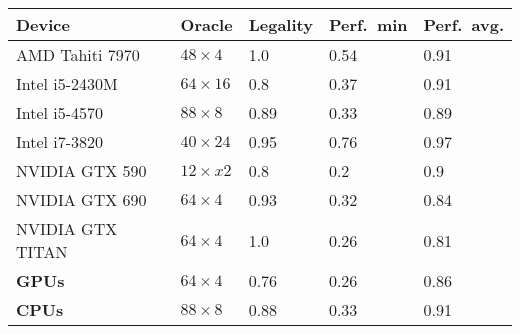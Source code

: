 \begin{tabular}{lllll}
  \toprule
  Device & Oracle & Legality & Perf.\ min & Perf.\ avg. \\
  \midrule
  AMD Tahiti 7970 &   $48\times 4$ & 1.0 & 0.54 & 0.91 \\
  Intel i5-2430M &  $64\times 16$ & 0.8 & 0.37 & 0.91 \\
  Intel i5-4570 &   $88\times 8$ & 0.89 & 0.33 & 0.89 \\
  Intel i7-3820 &  $40\times 24$ & 0.95 & 0.76 & 0.97 \\
  NVIDIA GTX 590 &  $12\times x2$ & 0.8 & 0.2 & 0.9 \\
  NVIDIA GTX 690 &   $64\times 4$ & 0.93 & 0.32 & 0.84 \\
  NVIDIA GTX TITAN &   $64\times 4$ & 1.0 & 0.26 & 0.81 \\
  \textbf{GPUs} &   $64\times 4$ & 0.76 & 0.26 & 0.86 \\
  \textbf{CPUs} &   $88\times 8$ & 0.88 & 0.33 & 0.91 \\
  \bottomrule
\end{tabular}

